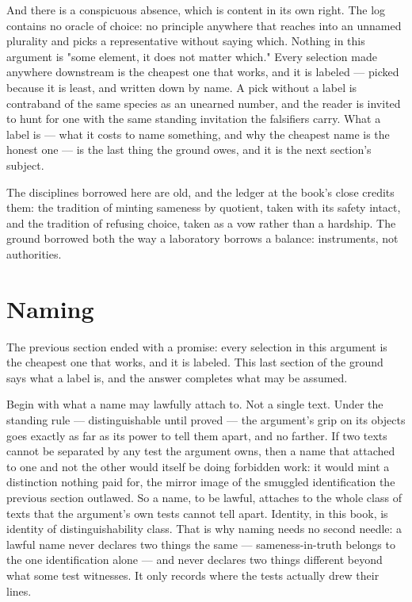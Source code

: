 And there is a conspicuous absence, which is content in its own right. The log contains
no oracle of choice: no principle anywhere that reaches into an unnamed plurality and
picks a representative without saying which. Nothing in this argument is "some element,
it does not matter which." Every selection made anywhere downstream is the cheapest one
that works, and it is labeled --- picked because it is least, and written down by name.
A pick without a label is contraband of the same species as an unearned number, and the
reader is invited to hunt for one with the same standing invitation the falsifiers
carry. What a label is --- what it costs to name something, and why the cheapest name
is the honest one --- is the last thing the ground owes, and it is the next section's
subject.

The disciplines borrowed here are old, and the ledger at the book's close credits them:
the tradition of minting sameness by quotient, taken with its safety intact, and the
tradition of refusing choice, taken as a vow rather than a hardship. The ground
borrowed both the way a laboratory borrows a balance: instruments, not authorities.

\section{Naming}

The previous section ended with a promise: every selection in this argument is the
cheapest one that works, and it is labeled. This last section of the ground says what a
label is, and the answer completes what may be assumed.

Begin with what a name may lawfully attach to. Not a single text. Under the standing
rule --- distinguishable until proved --- the argument's grip on its objects goes
exactly as far as its power to tell them apart, and no farther. If two texts cannot be
separated by any test the argument owns, then a name that attached to one and not the
other would itself be doing forbidden work: it would mint a distinction nothing paid
for, the mirror image of the smuggled identification the previous section outlawed. So
a name, to be lawful, attaches to the whole class of texts that the argument's own
tests cannot tell apart. Identity, in this book, is identity of distinguishability
class. That is why naming needs no second needle: a lawful name never declares two
things the same --- sameness-in-truth belongs to the one identification alone --- and
never declares two things different beyond what some test witnesses. It only records
where the tests actually drew their lines.

